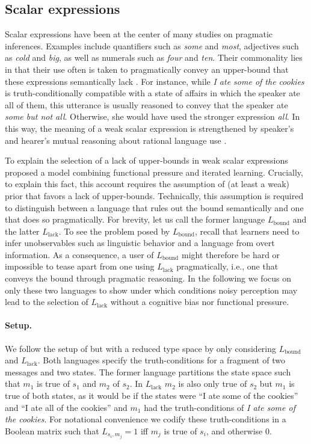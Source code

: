 \documentclass[10pt,a4paper]{article}
\begin{document}
\subsection{Scalar expressions}
Scalar expressions have been at the center of many studies on pragmatic inferences. Examples
include quantifiers such as {\em some} and {\em most}, adjectives such as {\em cold} and {\em
  big}, as well as numerals such as {\em four} and {\em ten}. Their commonality lies in that
their use often is taken to pragmatically convey an upper-bound that these expressions
semantically lack \citep{horn:1972,gazdar:1979}. For instance, while {\em I ate some of the
  cookies} is truth-conditionally compatible with a state of affairs in which the speaker ate
all of them, this utterance is usually reasoned to convey that the speaker ate {\em some but
  not all}. Otherwise, she would have used the stronger expression {\em all}. In this way, the
meaning of a weak scalar expression is strengthened by speaker's and hearer's mutual reasoning
about rational language use \citep{grice:1975}.

To explain the selection of a lack of upper-bounds in weak scalar expressions \citet{brochhagen+etal:2016:CogSci} proposed a model combining functional pressure and iterated learning.  Crucially, to explain this fact, this account requires the assumption of (at least a weak) prior that favors a lack of upper-bounds. Technically, this assumption is required to distinguish between a language that rules out the bound semantically and one that does so pragmatically. For brevity, let us call the former language $L_{\text{bound}}$ and the latter $L_{\text{lack}}$. To see the problem posed by $L_{\text{bound}}$, recall that learners need to infer unobservables such as linguistic behavior and a language from overt information. As a consequence, a user of $L_{\text{bound}}$ might therefore be hard or impossible to tease apart from one using $L_{\text{lack}}$ pragmatically, i.e., one that conveys the bound through pragmatic reasoning. In the following we focus on only these two languages to show under which conditions noisy perception may lead to the selection of $L_{\text{lack}}$ without a cognitive bias nor functional pressure.


\paragraph{Setup.} We follow the setup of \citet{brochhagen+etal:2016:CogSci} but with a reduced type space by only considering $L_{\text{bound}}$ and $L_{\text{lack}}$. Both languages specify the truth-conditions for a fragment of two messages and two states. The former language partitions the state space such that $m_1$ is true of $s_1$ and $m_2$ of $s_2$. In $L_{\text{lack}}$ $m_2$ is also only true of $s_2$ but $m_1$ is true of both states, as it would be if the states were ``I ate some of the cookies'' and ``I ate all of the cookies'' and $m_1$ had the truth-conditions of {\em I ate some of the cookies}. For notational convenience we codify these truth-conditions in a Boolean matrix such that $L_{s_i,m_j} = 1$ iff $m_j$ is true of $s_i$, and otherwise $0$.
\end{document}
